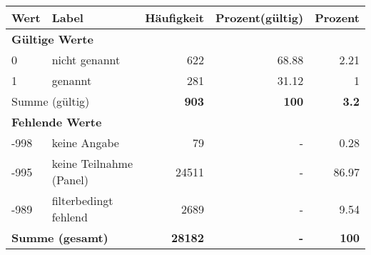      \begin{longtable}{lXrrr}
     \toprule
     \textbf{Wert} & \textbf{Label} & \textbf{Häufigkeit} & \textbf{Prozent(gültig)} & \textbf{Prozent} \\
     \endhead
     \midrule
     \multicolumn{5}{l}{\textbf{Gültige Werte}}\\

     0 &
     \multicolumn{1}{X}{ nicht genannt   } &


       \num{622} &
       \num[round-mode=places,round-precision=2]{68,88} &
         \num[round-mode=places,round-precision=2]{2,21} \\

     1 &
     \multicolumn{1}{X}{ genannt   } &


       \num{281} &
       \num[round-mode=places,round-precision=2]{31,12} &
         \num[round-mode=places,round-precision=2]{1} \\
     \midrule
     \multicolumn{2}{l}{Summe (gültig)} &
       \textbf{\num{903}} &
     \textbf{100} &
       \textbf{\num[round-mode=places,round-precision=2]{3,2}} \\
     \multicolumn{5}{l}{\textbf{Fehlende Werte}}\\
       -998 &
       keine Angabe &
         \num{79} &
        - &
         \num[round-mode=places,round-precision=2]{0,28} \\
       -995 &
       keine Teilnahme (Panel) &
         \num{24511} &
        - &
         \num[round-mode=places,round-precision=2]{86,97} \\
       -989 &
       filterbedingt fehlend &
         \num{2689} &
        - &
         \num[round-mode=places,round-precision=2]{9,54} \\
     \midrule
     \multicolumn{2}{l}{\textbf{Summe (gesamt)}} &
          \textbf{\num{28182}} &
        \textbf{-} &
        \textbf{100} \\
     \bottomrule
     \end{longtable}
     
